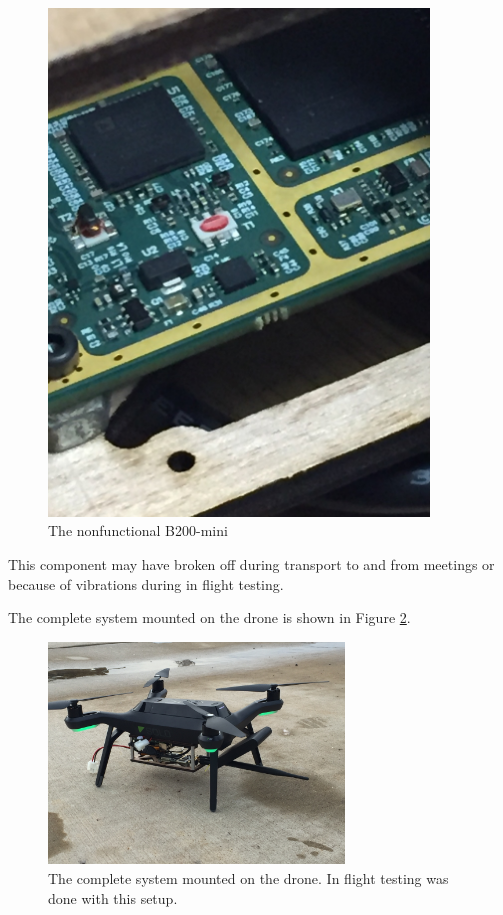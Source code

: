 \begin{figure}[ht!]
\begin{minipage}{0.5\textwidth}
\centering
\includegraphics[width=0.9\textwidth]{img/broken_mini.jpg}
\caption{The nonfunctional B200-mini}
\label{fig:broken_mini}
\end{minipage}
\end{figure}

This component may have broken off during transport to and from meetings or because of vibrations during in flight testing. \par

The complete system mounted on the drone is shown in Figure \ref{fig:drone_and_box}.
\begin{figure}[ht!]
	\centering
	\includegraphics[width=0.70\textwidth]{img/drone_and_box.jpg}
	\caption{The complete system mounted on the drone. In flight testing was done with this setup.}
	\label{fig:drone_and_box}
\end{figure}
\par

